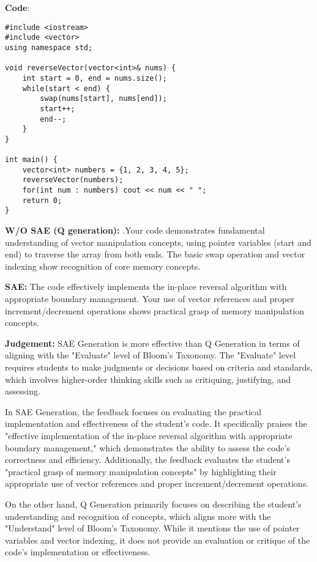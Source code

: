\textbf{Code}:
\begin{lstlisting}
#include <iostream>
#include <vector>
using namespace std;

void reverseVector(vector<int>& nums) {
    int start = 0, end = nums.size();
    while(start < end) {
        swap(nums[start], nums[end]);
        start++;
        end--;
    }
}

int main() {
    vector<int> numbers = {1, 2, 3, 4, 5};
    reverseVector(numbers);
    for(int num : numbers) cout << num << " ";
    return 0;
}
\end{lstlisting}
\textbf{W/O SAE (Q generation):} .Your code demonstrates fundamental understanding of vector manipulation concepts, using pointer variables (start and end) to traverse the array from both ends. The basic swap operation and vector indexing show recognition of core memory concepts.\par

\textbf{SAE:} The code effectively implements the in-place reversal algorithm with appropriate boundary management. Your use of vector references and proper increment/decrement operations shows practical grasp of memory manipulation concepts. \par
\textbf{Judgement:} SAE Generation  is more effective than Q Generation in terms of aligning with the "Evaluate" level of Bloom's Taxonomy. The "Evaluate" level requires students to make judgments or decisions based on criteria and standards, which involves higher-order thinking skills such as critiquing, justifying, and assessing.

In SAE Generation, the feedback focuses on evaluating the practical implementation and effectiveness of the student's code. It specifically praises the "effective implementation of the in-place reversal algorithm with appropriate boundary management," which demonstrates the ability to assess the code's correctness and efficiency. Additionally, the feedback evaluates the student's "practical grasp of memory manipulation concepts" by highlighting their appropriate use of vector references and proper increment/decrement operations.

On the other hand, Q Generation  primarily focuses on describing the student's understanding and recognition of concepts, which aligns more with the "Understand" level of Bloom's Taxonomy. While it mentions the use of pointer variables and vector indexing, it does not provide an evaluation or critique of the code's implementation or effectiveness.



